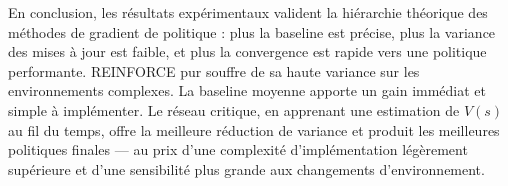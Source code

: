 \documentclass[12pt,a4paper]{article}
\begin{document}
\vspace{1em}

En conclusion, les résultats expérimentaux valident la hiérarchie théorique des méthodes de gradient de politique : plus la baseline est précise, plus la variance des mises à jour est faible, et plus la convergence est rapide vers une politique performante. REINFORCE pur souffre de sa haute variance sur les environnements complexes. La baseline moyenne apporte un gain immédiat et simple à implémenter. Le réseau critique, en apprenant une estimation de $V(s)$ au fil du temps, offre la meilleure réduction de variance et produit les meilleures politiques finales — au prix d'une complexité d'implémentation légèrement supérieure et d'une sensibilité plus grande aux changements d'environnement.
\end{document}
